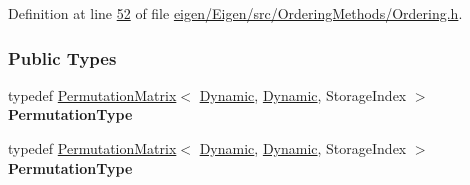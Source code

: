 Definition at line \hyperlink{eigen_2_eigen_2src_2_ordering_methods_2_ordering_8h_source_l00052}{52} of file \hyperlink{eigen_2_eigen_2src_2_ordering_methods_2_ordering_8h_source}{eigen/\+Eigen/src/\+Ordering\+Methods/\+Ordering.\+h}.

\subsubsection*{Public Types}
\begin{DoxyCompactItemize}
\item 
\mbox{\label{group___ordering_methods___module_ac28e5bdf8e7b08114bd76bc1fb95cc9a}} 
typedef \hyperlink{group___core___module_class_eigen_1_1_permutation_matrix}{Permutation\+Matrix}$<$ \hyperlink{namespace_eigen_ad81fa7195215a0ce30017dfac309f0b2}{Dynamic}, \hyperlink{namespace_eigen_ad81fa7195215a0ce30017dfac309f0b2}{Dynamic}, Storage\+Index $>$ {\bfseries Permutation\+Type}
\item 
\mbox{\label{group___ordering_methods___module_ac28e5bdf8e7b08114bd76bc1fb95cc9a}} 
typedef \hyperlink{group___core___module_class_eigen_1_1_permutation_matrix}{Permutation\+Matrix}$<$ \hyperlink{namespace_eigen_ad81fa7195215a0ce30017dfac309f0b2}{Dynamic}, \hyperlink{namespace_eigen_ad81fa7195215a0ce30017dfac309f0b2}{Dynamic}, Storage\+Index $>$ {\bfseries Permutation\+Type}
\end{DoxyCompactItemize}

